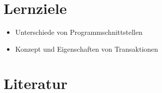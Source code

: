 \section*{Lernziele}
\begin{itemize}
	\item Unterschiede von Programmschnittstellen
	\item Konzept und Eigenschaften von Transaktionen
\end{itemize}



\section*{Literatur}


